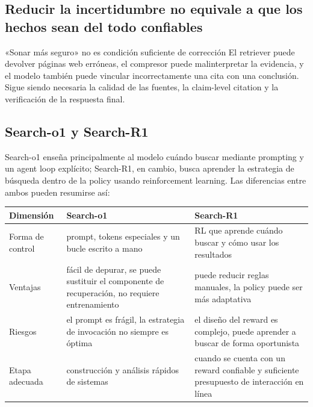 \documentclass[a4paper]{article}
\begin{document}
\subsection{Reducir la incertidumbre no equivale a que los hechos sean del todo confiables}



\begin{warningbox}{«Sonar más seguro» no es condición suficiente de corrección}
El retriever puede devolver páginas web erróneas, el compresor puede malinterpretar la evidencia, y el modelo también puede vincular incorrectamente una cita con una conclusión. Sigue siendo necesaria la calidad de las fuentes, la claim-level citation y la verificación de la respuesta final.
\end{warningbox}

\subsection{Search-o1 y Search-R1}

Search-o1 enseña principalmente al modelo cuándo buscar mediante prompting y un agent loop explícito; Search-R1, en cambio, busca aprender la estrategia de búsqueda dentro de la policy usando reinforcement learning. Las diferencias entre ambos pueden resumirse así:

\begin{table}[H]
\centering
\small
\begin{tabular}{>{\raggedright\arraybackslash}p{3cm}>{\raggedright\arraybackslash}p{4.7cm}>{\raggedright\arraybackslash}p{4.7cm}}
\toprule
\textbf{Dimensión} & \textbf{Search-o1} & \textbf{Search-R1} \\
\midrule
Forma de control & prompt, tokens especiales y un bucle escrito a mano & RL que aprende cuándo buscar y cómo usar los resultados \\
Ventajas & fácil de depurar, se puede sustituir el componente de recuperación, no requiere entrenamiento & puede reducir reglas manuales, la policy puede ser más adaptativa \\
Riesgos & el prompt es frágil, la estrategia de invocación no siempre es óptima & el diseño del reward es complejo, puede aprender a buscar de forma oportunista \\
Etapa adecuada & construcción y análisis rápidos de sistemas & cuando se cuenta con un reward confiable y suficiente presupuesto de interacción en línea \\
\bottomrule
\end{tabular}
\end{table}
\end{document}
